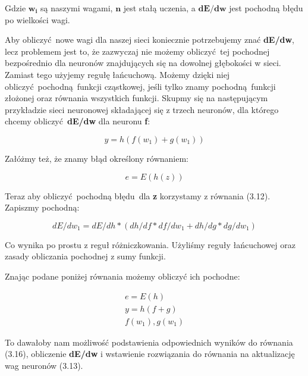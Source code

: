 \noindent Gdzie $\boldsymbol{w_i}$ są naszymi wagami, $\boldsymbol{n}$ jest stałą uczenia, a $\boldsymbol{dE/dw}$ jest pochodną błędu po wielkości wagi.\newline

Aby obliczyć nowe wagi dla naszej sieci koniecznie potrzebujemy znać \textbf{dE/dw}, lecz problemem jest to, że zazwyczaj nie możemy obliczyć tej pochodnej bezpośrednio dla neuronów znajdujących się na dowolnej głębokości w sieci. Zamiast tego użyjemy regułę łańcuchową. Możemy dzięki niej obliczyć pochodną funkcji cząstkowej, jeśli tylko znamy pochodną funkcji złożonej oraz równania wszystkich funkcji. Skupmy się na następującym przykładzie sieci neuronowej składającej się z trzech neuronów, dla którego chcemy obliczyć \textbf{dE/dw} dla neuronu \textbf{f}: 

\begin{equation}
y = h(f(w_1) + g(w_1))
\end{equation}

\noindent Załóżmy też, że znamy błąd określony równaniem:

\begin{equation}
e = E(h(z))
\end{equation}

\noindent Teraz aby obliczyć pochodną błędu dla \textbf{z} korzystamy z równania (3.12).
Zapiszmy pochodną:
 
\begin{equation}
dE/dw_1 = dE/dh * (dh/df * df/dw_1 + dh/dg * dg/dw_1)
\end{equation}

\noindent Co wynika po prostu z reguł różniczkowania. Użyliśmy reguły łańcuchowej oraz zasady obliczania pochodnej z sumy funkcji.\newline

\noindent Znając podane poniżej równania możemy obliczyć ich pochodne:
 
\begin{equation}
\begin{split}
e = E(h)
\\
y = h(f + g)
\\
f(w_1), g(w_1)
\end{split}
\end{equation}
 
To dawałoby nam możliwość podstawienia odpowiednich wyników do równania (3.16), obliczenie \textbf{dE/dw} i wstawienie rozwiązania do równania na aktualizację wag neuronów (3.13).\newline

